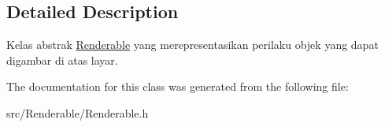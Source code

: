 \subsection{Detailed Description}
Kelas abstrak \hyperlink{classRenderable}{Renderable} yang merepresentasikan perilaku objek yang dapat digambar di atas layar. 

The documentation for this class was generated from the following file\+:\begin{DoxyCompactItemize}
\item 
src/\+Renderable/Renderable.\+h\end{DoxyCompactItemize}
